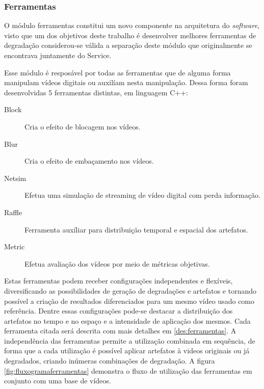 \subsubsection{Ferramentas}
\label{met:ferramentas}

O módulo ferramentas constitui um novo componente na arquitetura do \emph{software}, visto que um dos objetivos deste trabalho é desenvolver melhores ferramentas de degradação considerou-se válida a separação deste módulo que originalmente se encontrava juntamente do Service.

Esse módulo é resposável por todas as ferramentas que de alguma forma manipulam vídeos digitais ou auxilíam nesta manipulação. Dessa forma foram desenvolvidas 5 ferramentas distintas, em linguagem C++:

\begin{description}
	\item[Block] Cria o efeito de blocagem nos vídeos.
	\item[Blur] Cria o efeito de embaçamento nos vídeos.
	\item[Netsim] Efetua uma simulação de streaming de vídeo digital com perda informação.
	\item[Raffle] Ferramenta auxíliar para distribuição temporal e espacial dos artefatos.
	\item[Metric] Efetua avaliação dos vídeos por meio de métricas objetivas.
\end{description}

Estas ferramentas podem receber configurações independentes e flexíveis, diversificando as possibilidades de geração de degradações e artefatos e tornando possível a criação de resultados diferenciados para um mesmo vídeo usado como referência. Dentre essas configurações pode-se destacar a distribuição dos artefatos no tempo e no espaço e a intensidade de aplicação dos mesmos. Cada ferramenta citada será descrita com mais detalhes em \ref{des:ferramentas}. 
A independência das ferramentas permite a utilização combinada em sequência, de forma que a cada utilização é possível aplicar artefatos à videos originais ou já degradados, criando inúmeras combinações de degradação. A figura \ref{fig:fluxogramaferramentas} demonstra o fluxo de utilização das ferramentas em conjunto com uma base de vídeos.

